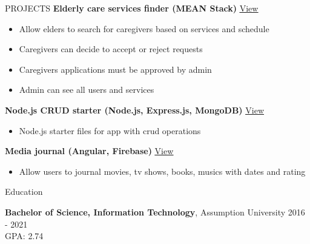 \documentclass{resume}
\begin{document}
\begin{rSection}{PROJECTS}
\textbf{Elderly care services finder (MEAN Stack)} \hfill
 \href{https://elderly-care.sophearith.dev/}{\underline{View}}
 \begin{itemize}
    \itemsep -4pt {} 
        \item Allow elders to search for caregivers based on services and schedule
        \item Caregivers can decide to accept or reject requests
        \item Caregivers applications must be approved by admin
        \item Admin can see all users and services
 \end{itemize}

\textbf{Node.js CRUD starter (Node.js, Express.js, MongoDB)} \hfill
\href{https://www.postman.com/sophearithsaing/workspace/public/collection/9440133-c5ee93be-3a67-4c70-a5b6-10a3168ad564?ctx=documentation}{\underline{View}}
 \begin{itemize}
    \itemsep -1pt {} 
        \item Node.js starter files for app with crud operations
 \end{itemize}

 \textbf{Media journal (Angular, Firebase)} \hfill
 \href{http://media.sophearith.dev/}{\underline{View}}
 \begin{itemize}
    \itemsep -1pt {} 
        \item Allow users to journal movies, tv shows, books, musics with dates and rating 
 \end{itemize}

\end{rSection} 


\begin{rSection}{Education}

{\bf Bachelor of Science, Information Technology}, Assumption 
University \hfill {2016 - 2021}\\
GPA: 2.74

\end{rSection}
\end{document}

